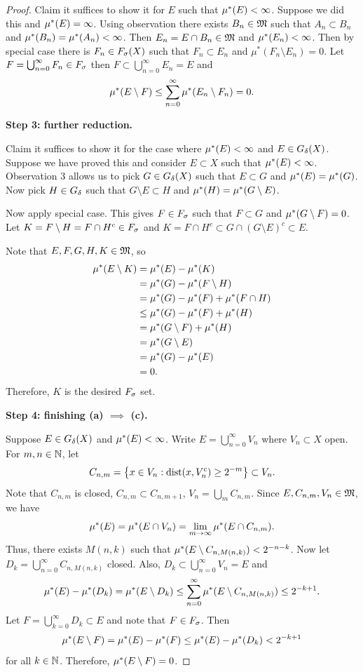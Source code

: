 \documentclass[a4paper]{article}
\renewcommand{\cupinfn}{\bigcup_{n=0}^\infty}
\renewcommand{\suminfn}{\sum_{n=0}^\infty}
\renewcommand{\cupinfk}{\bigcup_{k=0}^\infty}
\begin{document}
\begin{proof}
  Claim it suffices to show it for $E$ such that $\mu^*(E) < \infty$.
  Suppose we did this and $\mu^*(E) = \infty$. Using observation there
  exists $B_n \in \mathfrak{M}$ such that $A_n \subset B_n$ and $\mu^*(B_n) = \mu^*
  (A_n) < \infty$. Then $E_n = E \cap B_n \in \mathfrak{M}$ and $\mu^*(E_n) <
  \infty$. Then by special case there is $F_n \in F_\sigma(X)$ such that $F_n
  \subset E_n$ and $\mu^*(F_n \setminus E_n) = 0$. Let $F = \cupinfn F_n
  \in \fs$ then $F \subset \cupinfn E_n = E$ and
  \[
    \om(E \setminus F) \leq \suminfn \om (E_n \setminus F_n) = 0.
  \]

  \textbf{Step 3: further reduction.}

  Claim it suffices to show it for the case where $\mu^*(E) < \infty$ and $E
  \in G_\delta(X)$. Suppose we have proved this and consider $E \subset X$ such
  that $\mu^*(E) < \infty$. Observation 3 allows us to pick $G \in G_\delta(X)$
  such that $E \subset G$ and $\mu^*(E) = \mu^*(G)$. Now pick $H \in G_\delta$ such
  that $G \setminus E \subset H$ and $\mu^*(H) = \mu^*(G \setminus E)$.

  Now apply special case. This gives $F \in F_\sigma$ such that $F \subset G$
  and $\mu^*(G \setminus F) = 0$. Let $K = F \setminus H = F \cap H^c \in
  F_\sigma$ and $K = F \cap H^c \subset G \cap (G \setminus E)^c \subset E$.

  Note that $E, F, G, H, K \in \mathfrak{M}$, so
  \[
    \begin{aligned}
      \mu^*(E \setminus K)
       & = \mu^*(E) - \mu^*(K)                 \\
       & = \mu^*(G) - \mu^*(F \setminus H)     \\
       & = \mu^*(G) - \mu^*(F) + \mu^*(F \cap H) \\
       & \leq \mu^*(G) - \mu^*(F) + \mu^*(H)     \\
       & = \mu^*(G \setminus F) + \mu^*(H)     \\
       & = \mu^*(G \setminus E)              \\
       & = \mu^*(G) - \mu^*(E)                 \\
       & = 0.
    \end{aligned}
  \]
  Therefore, $K$ is the desired $F_\sigma$ set.

  \textbf{Step 4: finishing (a) $\implies$ (c). }

  Suppose $E \in G_\delta(X)$ and $\mu^*(E) < \infty$. Write $E = \cupinfn V_n$
  where $V_n \subset X$ open. For $m, n \in \mathbb{N}$, let
  \[
    C_{n, m} = \left\{ x \in V_n: \operatorname{dist}(x, V_n^c) \geq 2^{-m} \right\}
    \subset V_n.
  \]
  Note that $C_{n, m}$ is closed, $C_{n, m} \subset C_{n, m+1}$, $V_n =
  \bigcup_{m} C_{n, m}$. Since $E, C_{n, m}, V_n \in \mathfrak{M}$, we have
  \[
    \mu^*(E) = \mu^*(E \cap V_n) = \lim_{m \to \infty} \mu^*(E
    \cap C_{n, m}).
  \]
  Thus, there exists $M(n, k)$ such that $\mu^*(E \setminus C_{n, M(n, k)})
  < 2^{-n-k}$. Now let $D_k = \cupinfn C_{n, M(n, k)}$ closed. Also, $D_k
  \subset \cupinfn V_n = E$ and
  \[
    \om(E) - \om(D_k) = \om(E \setminus D_k)
    \leq \suminfn \om(E \setminus C_{n, M(n, k)}) \leq 2^{-k+1}.
  \]
  Let $F = \cupinfk D_k \subset E$ and note that $F \in F_\sigma$. Then
  \[
    \mu^*(E \setminus F) = \mu^*(E) - \mu^*(F)
    \leq \mu^*(E) - \mu^*(D_k) < 2^{-k+1}
  \]
  for all $k \in \mathbb{N}$. Therefore, $\mu^*(E \setminus F) = 0$.


\end{proof}
\end{document}
